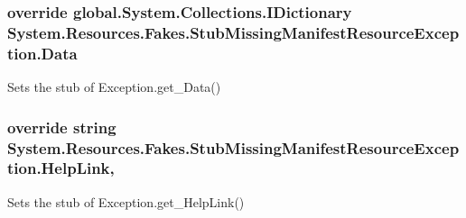 \hypertarget{class_system_1_1_resources_1_1_fakes_1_1_stub_missing_manifest_resource_exception_acd30aca79cadce39e99bb3b99d96e92c}{
\subsubsection[{Data}]{\setlength{\rightskip}{0pt plus 5cm}override global.\-System.\-Collections.\-I\-Dictionary System.\-Resources.\-Fakes.\-Stub\-Missing\-Manifest\-Resource\-Exception.\-Data\hspace{0.3cm}{\ttfamily [get]}}}\label{class_system_1_1_resources_1_1_fakes_1_1_stub_missing_manifest_resource_exception_acd30aca79cadce39e99bb3b99d96e92c}


Sets the stub of Exception.\-get\-\_\-\-Data()

\hypertarget{class_system_1_1_resources_1_1_fakes_1_1_stub_missing_manifest_resource_exception_a2f4de3717d03f1edca5b06c2d4d1e801}{
\subsubsection[{Help\-Link}]{\setlength{\rightskip}{0pt plus 5cm}override string System.\-Resources.\-Fakes.\-Stub\-Missing\-Manifest\-Resource\-Exception.\-Help\-Link\hspace{0.3cm}{\ttfamily [get]}, {\ttfamily [set]}}}\label{class_system_1_1_resources_1_1_fakes_1_1_stub_missing_manifest_resource_exception_a2f4de3717d03f1edca5b06c2d4d1e801}


Sets the stub of Exception.\-get\-\_\-\-Help\-Link()

